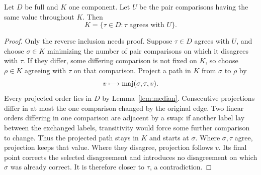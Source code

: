 \begin{lemma}\label{lem:projection}
Let \(D\) be full and \(K\) one component. Let \(U\) be the pair
comparisons having the same value throughout \(K\). Then
\[
 K=\{\tau\in D:\tau\text{ agrees with }U\}.
\]
\end{lemma}
\begin{proof}
Only the reverse inclusion needs proof. Suppose \(\tau\in D\) agrees
with \(U\), and choose \(\sigma\in K\) minimizing the number of pair
comparisons on which it disagrees with \(\tau\). If they differ,
some differing comparison is not fixed on \(K\), so choose
\(\rho\in K\) agreeing with \(\tau\) on that comparison. Project
a path in \(K\) from \(\sigma\) to \(\rho\) by
\[
 v\longmapsto\operatorname{maj}(\sigma,\tau,v).
\]
Every projected order lies in \(D\) by Lemma~\ref{lem:median}.
Consecutive projections differ in at most the one comparison changed
by the original edge. Two linear orders differing in one comparison
are adjacent by a swap: if another label lay between the exchanged
labels, transitivity would force some further comparison to change.
Thus the projected path stays in \(K\) and starts at \(\sigma\).
Where \(\sigma,\tau\) agree, projection keeps that value. Where
they disagree, projection follows \(v\). Its final point corrects
the selected disagreement and introduces no disagreement on which
\(\sigma\) was already correct. It is therefore closer to \(\tau\),
a contradiction.
\end{proof}

